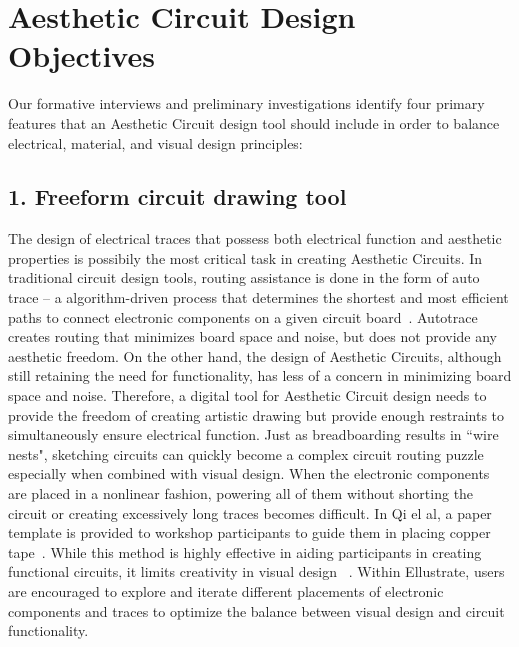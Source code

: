 \documentclass{sigchi}
\begin{document}
\section{Aesthetic Circuit Design Objectives}
Our formative interviews and preliminary investigations identify four primary features that an Aesthetic Circuit design tool should include in order to balance electrical, material, and visual design principles:

\subsection{1. Freeform circuit drawing tool}
The design of electrical traces that possess both electrical function and aesthetic properties is possibily the most critical task in creating Aesthetic Circuits. In traditional circuit design tools, routing assistance is done in the form of auto trace -- a algorithm-driven process that determines the shortest and most efficient paths to connect electronic components on a given circuit board~\cite{Fisk:1965tk}. Autotrace creates routing that minimizes board space and noise, but does not provide any aesthetic freedom. On the other hand, the design of Aesthetic Circuits, although still retaining the need for functionality, has less of a concern in minimizing board space and noise. Therefore, a digital tool for Aesthetic Circuit design needs to provide the freedom of creating artistic drawing but provide enough restraints to simultaneously ensure electrical function. Just as breadboarding results in ``wire nests", sketching circuits can quickly become a complex circuit routing puzzle especially when combined with visual design.
When the electronic components are placed in a nonlinear fashion, powering all of them without shorting the circuit or creating excessively long traces becomes difficult. In Qi el al, a paper template is provided to workshop participants to guide them in placing copper tape~\cite{Qi:2014bg}. While this method is highly effective in aiding participants in creating functional circuits, it limits creativity in visual design ~\cite{Qi:2014bg}. Within Ellustrate, users are encouraged to explore and iterate different placements of electronic components and traces to optimize the balance between visual design and circuit functionality. 
\end{document}
